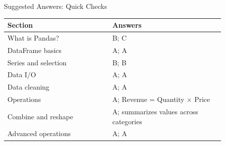 \documentclass[aspectratio=169,11pt]{beamer}
\begin{document}
\begin{frame}{Suggested Answers: Quick Checks}
\small
\begin{tabular}{p{0.42\linewidth}p{0.45\linewidth}}
\toprule
\textbf{Section} & \textbf{Answers} \\
\midrule
What is Pandas? & B; C \\
DataFrame basics & A; A \\
Series and selection & B; B \\
Data I/O & A; A \\
Data cleaning & A; A \\
Operations & A; Revenue = Quantity $\times$ Price \\
Combine and reshape & A; summarizes values across categories \\
Advanced operations & A; A \\
\bottomrule
\end{tabular}
\end{frame}
\end{document}
